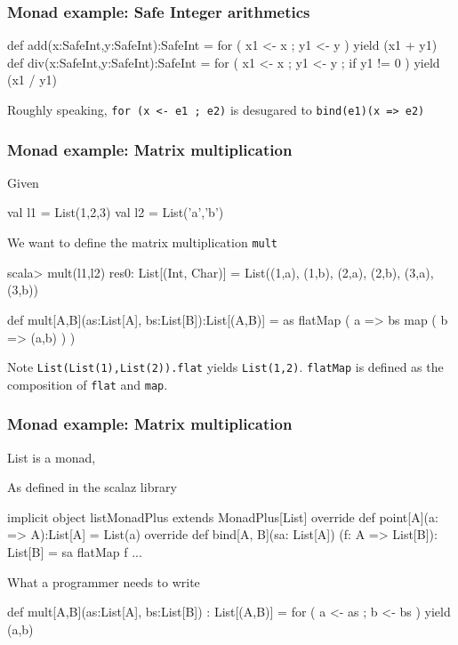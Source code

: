 \documentclass{beamer}
\newcommand{\beb}{\begin{exampleblock}}
\newcommand{\eeb}{\end{exampleblock}}
\begin{document}
\begin{frame}[fragile]
\frametitle{Monad example: Safe Integer arithmetics}
\beb{}
\begin{code}
def add(x:SafeInt,y:SafeInt):SafeInt = {
  for ( x1 <- x
  ; y1 <- y
  ) yield (x1 + y1)
}
def div(x:SafeInt,y:SafeInt):SafeInt = {
  for ( x1 <- x
  ; y1 <- y
  ; if y1 != 0
  ) yield (x1 / y1)
}
\end{code}
\eeb{}
Roughly speaking, {\tt for (x <- e1 ; e2)} is desugared to 
{\tt bind(e1)(x => e2)}
\end{frame}



\begin{frame}[fragile]
\frametitle{Monad example: Matrix multiplication}
Given
\beb{}
\begin{code}
val l1 = List(1,2,3)
val l2 = List('a','b')
\end{code}
\eeb
We want to define the matrix multiplication {\tt mult} 
\begin{code}
scala> mult(l1,l2)
res0: List[(Int, Char)] = List((1,a), (1,b), (2,a), (2,b), (3,a),
(3,b))
\end{code}
\beb{}
\begin{code}
def mult[A,B](as:List[A], bs:List[B]):List[(A,B)] = {
  as flatMap ( a => 
  bs map ( b => (a,b) )
  )
}
\end{code}
\eeb{}
Note {\tt List(List(1),List(2)).flat} yields {\tt List(1,2)}. {\tt flatMap}
is defined as the composition of {\tt flat} and {\tt map}.
\end{frame}


\begin{frame}[fragile]
\frametitle{Monad example: Matrix multiplication}
List is a monad,
\beb{As defined in the scalaz library}
\begin{code}
implicit object listMonadPlus extends MonadPlus[List] {
  override def point[A](a: => A):List[A] = List(a)
  override def bind[A, B](sa: List[A])
     (f: A => List[B]): List[B] = sa flatMap f
...
}
\end{code}
\eeb
\beb{What a programmer needs to write}
\begin{code}
def mult[A,B](as:List[A], bs:List[B]) : List[(A,B)] = for 
  ( a <- as
  ; b <- bs
  ) yield (a,b)
\end{code}
\eeb{}
\end{frame}
\end{document}
